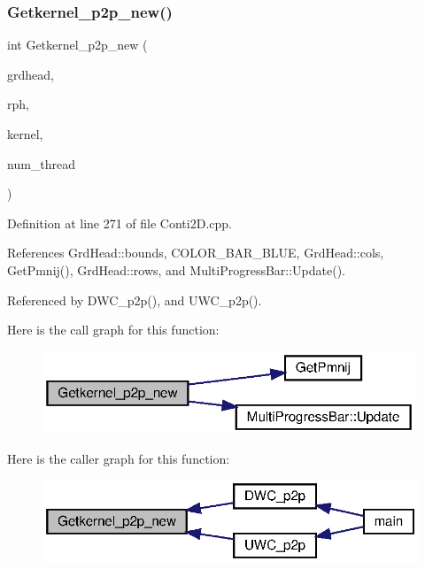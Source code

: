 \subsubsection{Getkernel\+\_\+p2p\+\_\+new()\hspace{0.1cm}{\footnotesize\ttfamily [2/2]}}
{\footnotesize\ttfamily int Getkernel\+\_\+p2p\+\_\+new (\begin{DoxyParamCaption}\item[{\textbf{ Grd\+Head}}]{grdhead,  }\item[{double}]{rph,  }\item[{double $\ast$$\ast$}]{kernel,  }\item[{int}]{num\+\_\+thread }\end{DoxyParamCaption})}



Definition at line 271 of file Conti2\+D.\+cpp.



References Grd\+Head\+::bounds, C\+O\+L\+O\+R\+\_\+\+B\+A\+R\+\_\+\+B\+L\+UE, Grd\+Head\+::cols, Get\+Pmnij(), Grd\+Head\+::rows, and Multi\+Progress\+Bar\+::\+Update().



Referenced by D\+W\+C\+\_\+p2p(), and U\+W\+C\+\_\+p2p().

Here is the call graph for this function\+:\nopagebreak
\begin{figure}[H]
\begin{center}
\leavevmode
\includegraphics[width=316pt]{Conti2D_8h_a6f44a06f2b4926f66481fccf277bea50_a6f44a06f2b4926f66481fccf277bea50_cgraph}
\end{center}
\end{figure}
Here is the caller graph for this function\+:\nopagebreak
\begin{figure}[H]
\begin{center}
\leavevmode
\includegraphics[width=321pt]{Conti2D_8h_a6f44a06f2b4926f66481fccf277bea50_a6f44a06f2b4926f66481fccf277bea50_icgraph}
\end{center}
\end{figure}
\mbox{\label{Conti2D_8h_a78d8a6b80166f8976a0f18caddbe1dcb_a78d8a6b80166f8976a0f18caddbe1dcb}} 
